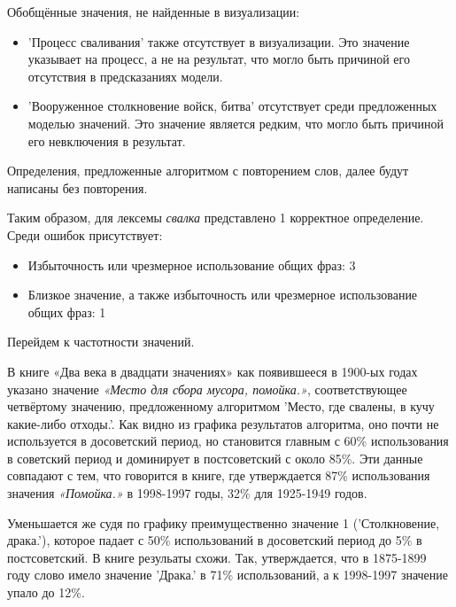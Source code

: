 Обобщённые значения, не найденные в визуализации:

\begin{itemize}
    \item ’Процесс сваливания’ также отсутствует в визуализации.
Это значение указывает на процесс, а не на результат, что могло быть причиной его отсутствия в предсказаниях модели.

    \item ’Вооруженное столкновение войск, битва’ отсутствует среди предложенных моделью значений.
Это значение является редким, что могло быть причиной его невключения в результат.
\end{itemize}

Определения, предложенные алгоритмом с повторением слов, далее будут написаны без повторения.

Таким образом, для лексемы \textit{свалка} представлено 1 корректное определение.
Среди ошибок присутствует:
\begin{itemize}
    \item Избыточность или чрезмерное использование общих фраз: 3
    \item Близкое значение, а также избыточность или чрезмерное использование общих фраз: 1
\end{itemize}

Перейдем к частотности значений.

В книге «Два века в двадцати значениях» как появившееся в 1900-ых годах указано
значение \textit{«Место для сбора мусора, помойка.»}, соответствующее четвёртому значению,
предложенному алгоритмом ’Место, где свалены, в кучу какие-либо отходы.’.
Как видно из графика результатов алгоритма, оно почти не используется в досоветский период,
но становится главным
с 60\% использования в советский период и доминирует в постсоветский с около 85\%.
Эти данные совпадают с тем, что говорится в книге, где утверждается 87\% использования
значения \textit{«Помойка.»} в 1998-1997 годы, 32\% для 1925-1949 годов.

Уменьшается же судя по графику преимущественно значение 1 (’Столкновение, драка.’),
которое падает с 50\% использований в досоветский период до 5\% в постсоветский.
В книге резульаты схожи.
Так, утверждается, что в 1875-1899 году слово имело значение ’Драка.’
в 71\% использований,
а к 1998-1997 значение упало до 12\%.

